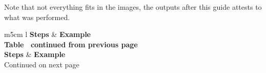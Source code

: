 \documentclass[11pt,a4paper]{report}
\begin{document}
    Note that not everything fits in the images, the outputs after this guide attests to what was performed.
    \begin{flushleft}
            \begin{center}
                \begin{longtable}{ m{5cm} l }
                    \textbf{Steps} & \textbf{Example} \\
                    \hline
                    \endfirsthead
                    {{\bfseries Table \thetable\ continued from previous page}} \\
                    \textbf{Steps} & \textbf{Example} \\
                    \hline
                    \endhead
                    \hline Continued on next page \\
                    \endfoot
                    \endlastfoot


\end{longtable}
\end{center}
\end{flushleft}
\end{document}
